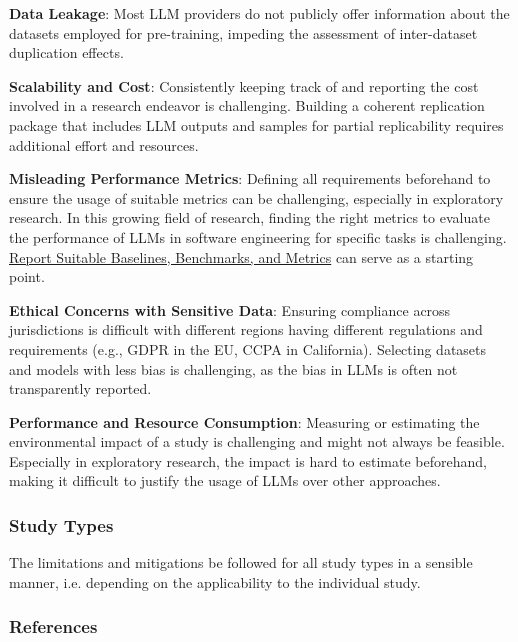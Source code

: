 \textbf{Data Leakage}:
Most LLM providers do not publicly offer information about the datasets employed for pre-training, impeding the assessment of inter-dataset duplication effects.

\textbf{Scalability and Cost}:
Consistently keeping track of and reporting the cost involved in a research endeavor is challenging.
Building a coherent replication package that includes LLM outputs and samples for partial replicability requires additional effort and resources.

\textbf{Misleading Performance Metrics}:
Defining all requirements beforehand to ensure the usage of suitable metrics can be challenging, especially in exploratory research.
In this growing field of research, finding the right metrics to evaluate the performance of LLMs in software engineering for specific tasks is challenging. \href{/guidelines/report-baselines-benchmarks-and-metrics}{Report Suitable Baselines, Benchmarks, and Metrics} can serve as a starting point.

\textbf{Ethical Concerns with Sensitive Data}:
Ensuring compliance across jurisdictions is difficult with different regions having different regulations and requirements (e.g., GDPR in the EU, CCPA in California).
Selecting datasets and models with less bias is challenging, as the bias in LLMs is often not transparently reported.

\textbf{Performance and Resource Consumption}:
Measuring or estimating the environmental impact of a study is challenging and might not always be feasible. Especially in exploratory research, the impact is hard to estimate beforehand, making it difficult to justify the usage of LLMs over other approaches.

\subsubsection{Study Types}
The limitations and mitigations \should be followed for all study types in a sensible manner, i.e. depending on the applicability to the individual study.


\subsubsection{References}





